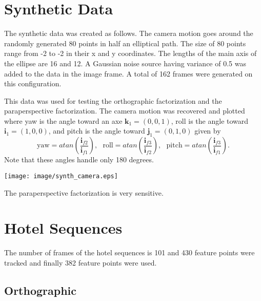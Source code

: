 \section{Synthetic Data}

The synthetic data was created as follows. The camera motion goes around the randomly generated 80 points in half an elliptical path. The size of 80 points range from -2 to -2 in their x and y coordinates. The lengths of the main axis of the ellipse are 16 and 12. A Gaussian noise source having variance of 0.5 was added to the data in the image frame. A total of 162 frames were generated on this configuration. 

This data was used for testing the orthographic factorization and the paraperspective factorization. 
The camera motion was recovered and plotted where yaw is the angle toward an axe $ \textbf{k}_1 = (0, 0, 1) $, roll is the angle toward $ \textbf{i}_1 = (1, 0, 0) $, and pitch is the angle toward $ \textbf{j}_1 = (0, 1, 0) $ given by
$$ \text{yaw} = atan\left( \frac{\textbf{i}_{f2}}{ \textbf{i}_{f1}}\right), \ \ \ 
\text{roll}  =  atan\left( \frac{\textbf{i}_{f3}}{ \textbf{i}_{f2}}\right), \ \ \ 
\text{pitch} = atan\left( \frac{\textbf{i}_{f3}}{ \textbf{i}_{f1}}\right). $$
Note that these angles handle only 180 degrees. 
\begin{center}
\texttt{[image: image/synth\_camera.eps]}
\end{center}

The paraperspective factorization is very sensitive. 

\newpage

\section{Hotel Sequences}

The number of frames of the hotel sequences is 101 and 430 feature points were tracked and finally 382 feature points were used. 

\subsection{Orthographic}

